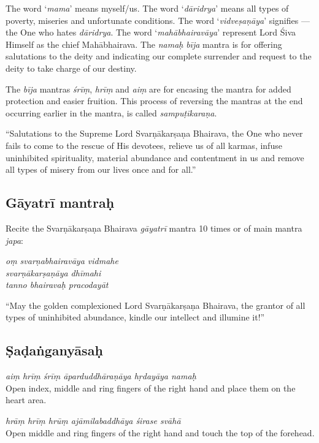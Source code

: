\documentclass[11pt,oneside,a4paper]{article}
\newenvironment{shloka}[1]
  {\bigskip\center#1\varwidth{\linewidth}}
  {\endvarwidth\endcenter\bigskip}
\newcommand{\tl}[1]{\emph{#1}}
\begin{document}
The word ‘\tl{mama}’ means myself/us. The word ‘\tl{dāridrya}’ means all types
of poverty, miseries and unfortunate conditions. The word ‘\tl{vidveṣaṇāya}’
signifies — the One who hates \tl{dāridrya}. The word ‘\tl{mahābhairavāya}’
represent Lord Śiva Himself as the chief Mahābhairava. The \tl{namaḥ} \tl{bīja}
mantra is for offering salutations to the deity and indicating our complete
surrender and request to the deity to take charge of our destiny.

The \tl{bīja} mantras \tl{śrīṃ}, \tl{hrīṃ} and \tl{aiṃ} are for encasing
the mantra for added protection and easier fruition. This process of reversing
the mantras at the end occurring earlier in the mantra, is called
\tl{sampuṭīkaraṇa}.

``Salutations to the Supreme Lord Svarṇākarṣaṇa Bhairava, the One who never fails
to come to the rescue of His devotees, relieve us of all karmas, infuse
uninhibited spirituality, material abundance and contentment in us and remove
all types of misery from our lives once and for all.''

\subsection{Gāyatrī mantraḥ}

Recite the Svarṇākarṣaṇa Bhairava \tl{gāyatrī} mantra 10 times or 
of main mantra \tl{japa}:

\begin{shloka}\itshape
  oṃ svarṇabhairavāya vidmahe\\
  svarṇākarṣaṇāya dhīmahi\\
  tanno bhairavaḥ pracodayāt
\end{shloka}

``May the golden complexioned Lord Svarṇākarṣaṇa Bhairava, the grantor of all
types of uninhibited abundance, kindle our intellect and illumine it!''

\subsection{Ṣaḍaṅganyāsaḥ}

\tl{aiṃ hrīṃ śrīṃ āparduddhāraṇāya hṛdayāya namaḥ}\\
Open index, middle and ring fingers of the right hand and place them on
the heart area.

\tl{hrāṃ hrīṃ hrūṃ ajāmilabaddhāya śirase svāhā}\\
Open middle and ring fingers of the right hand and touch the top of
the forehead.
\end{document}
